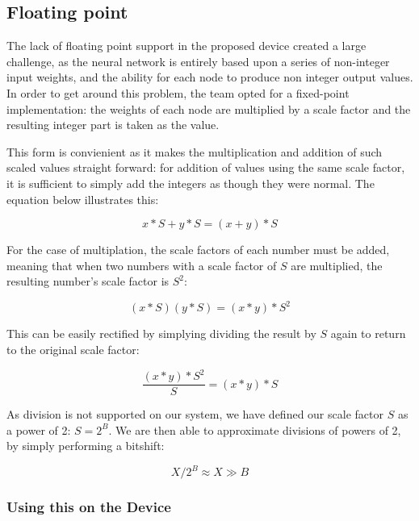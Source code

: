 \subsection{Floating point}
The lack of floating point support in the proposed device created a large challenge, as the neural network is entirely based upon a series of non-integer input weights, and the ability for each node to produce non integer output values. In order to get around this problem, the team opted for a fixed-point implementation: the weights of each node are multiplied by a scale factor and the resulting integer part is taken as the value.

This form is convienient as it makes the multiplication and addition of such scaled values straight forward: for addition of values using the same scale factor, it is sufficient to simply add the integers as though they were normal. The equation below illustrates this:

\begin{equation}
\label{eq:bits:addition}
x*S+y*S=(x+y)*S
\end{equation}

For the case of multiplation, the scale factors of each number must be added, meaning that when two numbers with a scale factor of $S$ are multiplied, the resulting number's scale factor is $S^2$:

\begin{equation}
\label{eq:bits:multiplication}
(x*S)(y*S)=(x*y)*S^2
\end{equation}

This can be easily rectified by simplying dividing the result by $S$ again to return to the original scale factor:

\begin{equation}
\label{eq:bits:rescale}
\frac{(x*y)*S^2}{S}=(x*y)*S
\end{equation}

As division is not supported on our system, we have defined our scale factor $S$ as a power of 2: $S=2^B$. We are then able to approximate divisions of powers of 2, by simply performing a bitshift:

\begin{equation}
\label{eq:bits:div_approx}
X/2^B\approx X \gg B
\end{equation}

\subsubsection{Using this on the Device}

